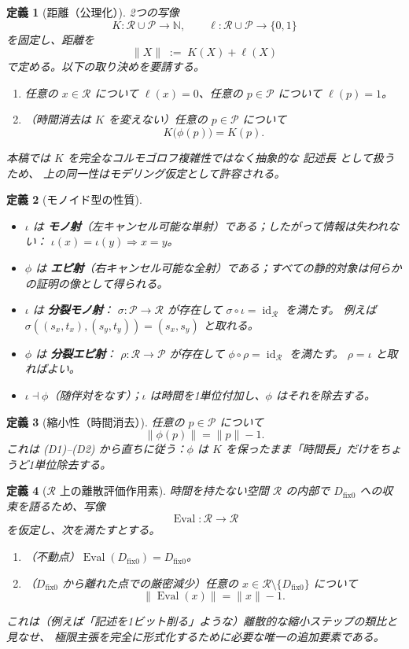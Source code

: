\documentclass[12pt,a4paper]{article}
\newcommand{\dfix}{D_{\mathrm{fix}0}} %
\newcommand{\Rep}{\mathcal{R}}           %
\newcommand{\Prf}{\mathcal{P}}           %
\newtheorem{definition}{定義}[section]
\begin{document}
\begin{definition}[距離（公理化）]
2つの写像
\[
  K:\Rep\cup\Prf\to\mathbb{N},
  \qquad
  \ell:\Rep\cup\Prf\to\{0,1\}
\]
を固定し、距離を
\[
  \|X\|\;:=\;K(X)+\ell(X)
\]
で定める。以下の取り決めを要請する。
\begin{enumerate}[label=(D\arabic*)]
  \item 任意の $x\in\Rep$ について $\ell(x)=0$、任意の $p\in\Prf$ について $\ell(p)=1$。
  \item（時間消去は $K$ を変えない）任意の $p\in\Prf$ について
        \[
          K\bigl(\phi(p)\bigr)=K(p).
        \]
\end{enumerate}
本稿では $K$ を完全なコルモゴロフ複雑性ではなく抽象的な \emph{記述長} として扱うため、
上の同一性はモデリング仮定として許容される。
\end{definition}

\begin{definition}[モノイド型の性質]
\begin{itemize}[nosep]
  \item $\iota$ は \textbf{モノ射}（左キャンセル可能な単射）である；したがって情報は失われない：
        $\iota(x)=\iota(y)\Rightarrow x=y$。
  \item $\phi$ は \textbf{エピ射}（右キャンセル可能な全射）である；すべての静的対象は何らかの証明の像として得られる。
  \item $\iota$ は \textbf{分裂モノ射}：
        $\sigma:\Prf\to\Rep$ が存在して $\sigma\circ\iota=\operatorname{id}_{\Rep}$ を満たす。
        例えば $\sigma((s_x,t_x),(s_y,t_y))=(s_x,s_y)$ と取れる。
  \item $\phi$ は \textbf{分裂エピ射}：
        $\rho:\Rep\to\Prf$ が存在して $\phi\circ\rho=\operatorname{id}_{\Rep}$ を満たす。
        $\rho=\iota$ と取ればよい。
  \item $\iota\dashv\phi$（随伴対をなす）；$\iota$ は時間を1単位付加し、$\phi$ はそれを除去する。
\end{itemize}
\end{definition}

\begin{definition}[縮小性（時間消去）]
任意の $p\in\Prf$ について
\[
  \|\phi(p)\| = \|p\|-1.
\]
これは (D1)--(D2) から直ちに従う：$\phi$ は $K$ を保ったまま「時間長」だけをちょうど1単位除去する。
\end{definition}

\begin{definition}[$\Rep$ 上の離散評価作用素]
時間を持たない空間 $\Rep$ の内部で $\dfix$ への収束を語るため、写像
\[
  \operatorname{Eval}:\Rep\to\Rep
\]
を仮定し、次を満たすとする。
\begin{enumerate}[label=(E\arabic*)]
  \item（不動点）$\operatorname{Eval}(\dfix)=\dfix$。
  \item（$\dfix$ から離れた点での厳密減少）任意の $x\in\Rep\setminus\{\dfix\}$ について
        \[
          \|\operatorname{Eval}(x)\| = \|x\|-1.
        \]
\end{enumerate}
これは（例えば「記述を1ビット削る」ような）離散的な縮小ステップの類比と見なせ、
極限主張を完全に形式化するために必要な唯一の追加要素である。
\end{definition}
\end{document}
